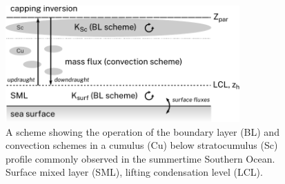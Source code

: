 \clearpage

\begin{figure}[t]
\centering
\includegraphics[width=0.8\textwidth]{chapter4/fig/scheme.pdf}
\caption[A scheme showing the operation of the boundary layer and convection schemes]{A scheme showing the operation of the boundary layer (BL)
and convection schemes in a cumulus (Cu) below stratocumulus (Sc) profile
commonly observed in the summertime Southern Ocean. Surface mixed layer (SML),
lifting condensation level (LCL).
}
\label{fig:scheme}
\end{figure}

\clearpage

